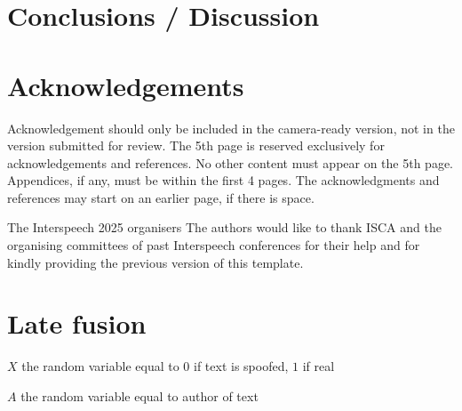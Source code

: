\documentclass{Interspeech}
\begin{document}

\section{Conclusions / Discussion}\label{sec:conclusions}

\ifinterspeechfinal
  \section{Acknowledgements}
  Acknowledgement should only be included in the camera-ready version, not in the
  version submitted for review. The 5th page is reserved exclusively for
  acknowledgements and references. No other content must appear on the 5th page.
  Appendices, if any, must be within the first 4 pages. The acknowledgments and
  references may start on an earlier page, if there is space.

  \ifinterspeechfinal
    The Interspeech 2025 organisers
  \else
    The authors
  \fi
  would like to thank ISCA and the organising committees of past Interspeech conferences for their help and for kindly providing the previous version of this template.
\fi




\section{Late fusion}
\label{sec:late-fusion}

$X$ the random variable equal to $0$ if text is spoofed, $1$ if real

$A$ the random variable equal to author of text
\end{document}
